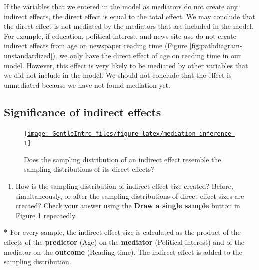 \documentclass[a4paper]{book}
\newenvironment{Shaded}{\begin{snugshade}}{\end{snugshade}}
\newcommand{\KeywordTok}[1]{\textcolor[rgb]{0,0,0}{\textbf{#1}}}
\newcommand{\StringTok}[1]{\textcolor[rgb]{0.00,0.00,0.00}{#1}}
\newcommand{\OperatorTok}[1]{\textcolor[rgb]{0.00,0.00,0.00}{\textbf{#1}}}
\newcommand{\NormalTok}[1]{#1}
\providecommand{\tightlist}{%
  \setlength{\itemsep}{0pt}\setlength{\parskip}{0pt}}
\theoremstyle{definition}
\theoremstyle{definition}
\theoremstyle{definition}
\theoremstyle{remark}
\begin{document}
If the variables that we entered in the model as mediators do not create
any indirect effects, the direct effect is equal to the total effect. We
may conclude that the direct effect is not mediated by the mediators
that are included in the model. For example, if education, political
interest, and news site use do not create indirect effects from age on
newspaper reading time (Figure \ref{fig:pathdiagram-unstandardized}), we
only have the direct effect of age on reading time in our model.
However, this effect is very likely to be mediated by other variables
that we did not include in the model. We should not conclude that the
effect is unmediated because we have not found mediation yet.

\subsection{Significance of indirect
effects}\label{significance-of-indirect-effects}

\begin{figure}[H]
\href{http://82.196.4.233:3838/apps/mediation-inference/}{\texttt{[image: GentleIntro\_files/figure-latex/mediation-inference-1]} }\caption{Does the sampling distribution of an indirect effect resemble the sampling distributions of its direct effects?}\label{fig:mediation-inference}
\end{figure}

\begin{enumerate}
\def\labelenumi{\arabic{enumi}.}
\tightlist
\item
  How is the sampling distribution of indirect effect size created?
  Before, simultaneously, or after the sampling distributions of direct
  effect sizes are created? Check your answer using the \textbf{Draw a
  single sample} button in Figure \ref{fig:mediation-inference}
  repeatedly.
\end{enumerate}

\begin{Shaded}
\begin{Highlighting}[]
\OperatorTok{*}\StringTok{ }\NormalTok{For every sample, the indirect effect size is calculated as the product of}
\NormalTok{the effects of the }\KeywordTok{predictor}\NormalTok{ (Age) on the }\KeywordTok{mediator}\NormalTok{ (Political interest) and of}
\NormalTok{the mediator on the }\KeywordTok{outcome}\NormalTok{ (Reading time). The indirect effect is added to}
\NormalTok{the sampling distribution.}
\end{Highlighting}
\end{Shaded}
\end{document}
